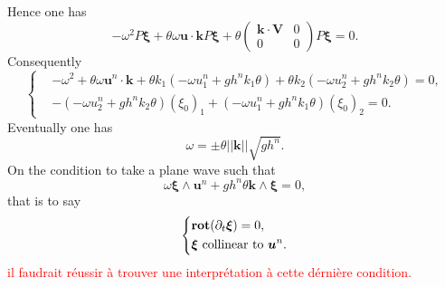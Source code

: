 \documentclass[a4paper, 11pt]{article}
\begin{document}
Hence one has
\begin{equation*}
-\omega^2P\boldsymbol{\xi}+\theta\omega \boldsymbol{u}\cdot \boldsymbol{k}P\boldsymbol{\xi}+\theta\begin{pmatrix}\boldsymbol{k}\cdot \boldsymbol{V}&0\\0&0\end{pmatrix}P\boldsymbol{\xi}=0.
\end{equation*}
Consequently
\begin{equation*}
\left\{\begin{split}
&-\omega^2+\theta\omega \boldsymbol{u}^n\cdot \boldsymbol{k}+\theta k_1(-\omega u_1^n+gh^nk_1\theta)+\theta k_2(-\omega u_2^n+gh^nk_2\theta)=0,\\
&-(-\omega u_2^n+gh^nk_2\theta)(\xi_0)_1+(-\omega u_1^n+gh^nk_1\theta)(\xi_0)_2=0.
\end{split}
\right.
\end{equation*}
Eventually one has
\begin{equation*}
\omega=\pm\theta||\boldsymbol{k}||\sqrt{gh^n}.
\end{equation*}
On the condition to take a plane wave such that 
\begin{equation*}
\omega \boldsymbol{\xi}\wedge\boldsymbol{u}^n+gh^n\theta\boldsymbol{k}\wedge\boldsymbol{\xi}=0,
\end{equation*}
that is to say
\begin{equation*}
\left\{\begin{split}
&\text{\textbf{rot}}(\partial_t \boldsymbol{\xi})=0,\\
&\boldsymbol{\xi}\text{\ collinear\ to\ }\boldsymbol{u}^n.
\end{split}\right.
\end{equation*}
\textcolor{red}{il faudrait r\'eussir \`a trouver une interpr\'etation \`a cette d\'erni\`ere condition.}\\
\end{document}
